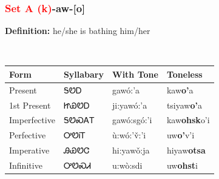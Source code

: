 \subsubsection*{\textcolor{Red}{Set A (k)}{-}\textbf{aw}{-}[o]}
\nopagebreak
\textbf{Definition: } he/she is bathing him/her
\\[0.5em]
\begin{tabularx}{\textwidth}{l X X X}%
\toprule%
\textbf{Form}&\textbf{Syllabary}&\textbf{With Tone}&\textbf{Toneless}\\%
\midrule%
Present&ᎦᏬᎠ&gawó:’a&kaw\textbf{o'}a\\%
1st Present&ᏥᏯᏬᎠ&ji:yawó:’a&tsiyaw\textbf{o'}a\\%
Imperfective&ᎦᏬᏍᎪᎢ&gawó:sgó:’i&kaw\textbf{ohsk}o'i\\%
Perfective&ᎤᏬᎥᎢ&ù:wó:’v̌:’i&uw\textbf{o'}v'i\\%
Imperative&ᎯᏯᏬᏣ&hi:yawǒ:ja&hiyaw\textbf{otsa}\\%
Infinitive&ᎤᏬᏍᏗ&u:wò:sdi&uw\textbf{ohst}i\\%
\bottomrule%
\end{tabularx}
\\[1em]